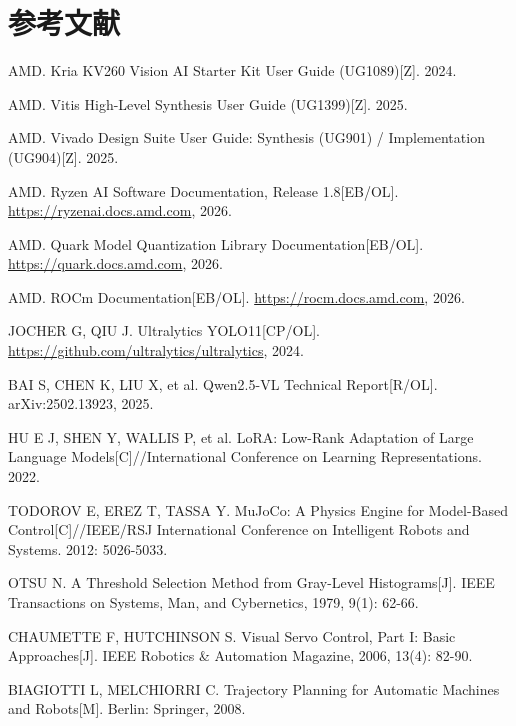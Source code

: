 \section{参考文献}

{\small\raggedright
\begin{enumerate}[label={[\arabic*]},ref=\arabic*,leftmargin=2.2em,itemsep=1pt]
  \item\label{ref:kv260} AMD. Kria KV260 Vision AI Starter Kit User Guide (UG1089)[Z]. 2024.
  \item\label{ref:hls} AMD. Vitis High-Level Synthesis User Guide (UG1399)[Z]. 2025.
  \item\label{ref:vivado} AMD. Vivado Design Suite User Guide: Synthesis (UG901) / Implementation (UG904)[Z]. 2025.
  \item\label{ref:ryzen} AMD. Ryzen AI Software Documentation, Release 1.8[EB/OL]. \url{https://ryzenai.docs.amd.com}, 2026.
  \item\label{ref:quark} AMD. Quark Model Quantization Library Documentation[EB/OL]. \url{https://quark.docs.amd.com}, 2026.
  \item\label{ref:rocm} AMD. ROCm Documentation[EB/OL]. \url{https://rocm.docs.amd.com}, 2026.
  \item\label{ref:yolo} JOCHER G, QIU J. Ultralytics YOLO11[CP/OL]. \url{https://github.com/ultralytics/ultralytics}, 2024.
  \item\label{ref:qwen} BAI S, CHEN K, LIU X, et al. Qwen2.5-VL Technical Report[R/OL]. arXiv:2502.13923, 2025.
  \item\label{ref:lora} HU E J, SHEN Y, WALLIS P, et al. LoRA: Low-Rank Adaptation of Large Language Models[C]//\allowbreak International Conference on Learning Representations. 2022.
  \item\label{ref:mujoco} TODOROV E, EREZ T, TASSA Y. MuJoCo: A Physics Engine for Model-Based Control[C]//\allowbreak IEEE/RSJ International Conference on Intelligent Robots and Systems. 2012: 5026-5033.
  \item\label{ref:otsu} OTSU N. A Threshold Selection Method from Gray-Level Histograms[J]. IEEE Transactions on Systems, Man, and Cybernetics, 1979, 9(1): 62-66.
  \item\label{ref:servo} CHAUMETTE F, HUTCHINSON S. Visual Servo Control, Part I: Basic Approaches[J]. IEEE Robotics \& Automation Magazine, 2006, 13(4): 82-90.
  \item\label{ref:trajectory} BIAGIOTTI L, MELCHIORRI C. Trajectory Planning for Automatic Machines and Robots[M]. Berlin: Springer, 2008.

\end{enumerate}}
